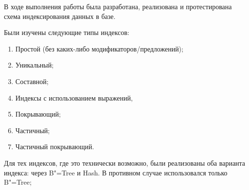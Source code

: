 \documentclass[otchet]{SCWorks}
\begin{document}

\date{2026}

\maketitle

\secNumbering

\tableofcontents




\intro
В ходе выполнения работы была разработана, реализована и протестирована схема индексирования данных в базе.

Были изучены следующие типы индексов:
\begin{enumerate}
    \item Простой (без каких-либо модификаторов/предложений);
    \item Уникальный;
    \item Составной;
    \item Индексы с использованием выражений,
    \item Покрывающий;
    \item Частичный;
    \item Частичный покрывающий.
\end{enumerate}

Для тех индексов, где это технически возможно, были реализованы оба варианта индекса: через B"=Tree и Hash. В противном случае использовался только B"=Tree;
\end{document}
